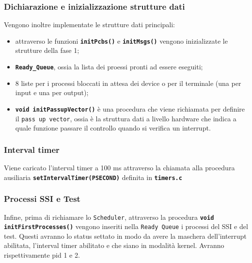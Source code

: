 \documentclass{article}
\begin{document}
\subsubsection{Dichiarazione e inizializzazione strutture dati}
Vengono inoltre implementate le strutture dati principali: 
\begin{itemize}
    \item attraverso le funzioni  \texttt{\textbf{initPcbs()}} e \texttt{\textbf{initMsgs()}} vengono inizializzate le strutture della fase 1;
    \item \texttt{\textbf{Ready\_Queue}}, ossia la lista dei proessi pronti ad essere eseguiti;
    \item 8 liste per i processi bloccati in attesa dei device o per il terminale (una per input e una per output);
    \item \texttt{\textbf{void initPassupVector()}} è una procedura che viene richiamata per definire il \texttt{pass up vector}, ossia è la struttura dati a livello hardware che indica a quale funzione passare il controllo quando si verifica un interrupt.
\end{itemize}
\subsubsection{Interval timer}
Viene caricato l'interval timer a 100 ms attraverso la chiamata alla procedura ausiliaria \texttt{\textbf{setIntervalTimer(PSECOND)}} definita in \texttt{\textbf{timers.c}}

\newpage

\subsubsection{Processi SSI e Test}
Infine, prima di richiamare lo \texttt{Scheduler}, attraverso la procedura \texttt{\textbf{void initFirstProcesses()}} vengono inseriti nella \texttt{Ready Queue} i processi del SSI e del test. Questi avranno lo status settato in modo da avere la maschera dell'interrupt abilitata, l'interval timer abilitato e che siano in modalità kernel. Avranno rispettivamente pid 1 e 2.
\end{document}
